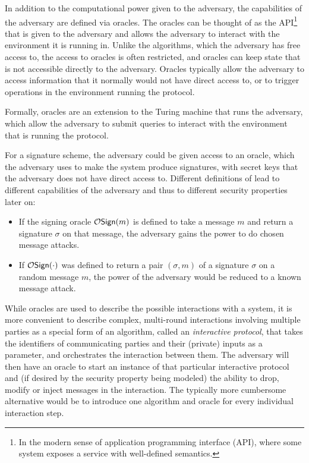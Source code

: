 In addition to the computational power given to the adversary, the capabilities
of the adversary are defined via oracles.  The oracles can be thought of as the
API\footnote{In the modern sense of application programming interface (API),
where some system exposes a service with well-defined semantics.} that is given
to the adversary and allows the adversary to interact with the environment it
is running in.  Unlike the algorithms, which the adversary has free access to,
the access to oracles is often restricted, and oracles can keep state that is
not accessible directly to the adversary.  Oracles typically allow the
adversary to access information that it normally would not have direct access
to, or to trigger operations in the environment running the protocol.

Formally, oracles are an extension to the Turing machine that runs the
adversary, which allow the adversary to submit queries to interact with the
environment that is running the protocol.


For a signature scheme, the adversary could be given access to an 
oracle, which the adversary uses to make the system produce signatures, with
secret keys that the adversary does not have direct access to.  Different
definitions of  lead to different capabilities of the adversary and
thus to different security properties later on:
\begin{itemize}
  \item If the signing oracle $\mathcal{O}\mathsf{Sign}(m)$ is defined to take a message $m$ and return
    a signature $\sigma$ on that message, the adversary gains the power to do chosen message attacks.
  \item If $\mathcal{O}\mathsf{Sign}(\cdot)$ was defined to return a pair $(\sigma, m)$ of a signature $\sigma$
    on a random message $m$, the power of the adversary would be reduced to a known message attack.
\end{itemize}

While oracles are used to describe the possible interactions with a system, it
is more convenient to describe complex, multi-round interactions involving
multiple parties as a special form of an algorithm, called an \emph{interactive
protocol}, that takes the identifiers of communicating parties and their
(private) inputs as a parameter, and orchestrates the interaction between them.
The adversary will then have an oracle to start an instance of that particular
interactive protocol and (if desired by the security property being modeled)
the ability to drop, modify or inject messages in the interaction.  The
typically more cumbersome alternative would be to introduce one algorithm and
oracle for every individual interaction step.

